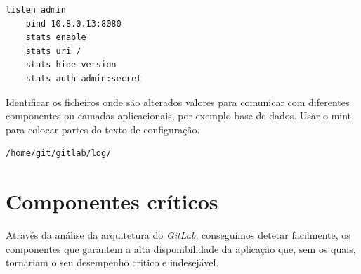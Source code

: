 \documentclass[12pt,a4paper]{article}
\begin{document}
\begin{verbatim}
listen admin  
    bind 10.8.0.13:8080
    stats enable
    stats uri /
    stats hide-version
    stats auth admin:secret
\end{verbatim}















Identificar os ficheiros onde são alterados valores para comunicar com diferentes componentes ou camadas aplicacionais, por exemplo base de dados.
Usar o mint para colocar partes do texto de configuração.

\begin{verbatim}
/home/git/gitlab/log/
\end{verbatim}








\newpage
\section{Componentes críticos}

Através da análise da arquitetura do \emph{GitLab}, conseguimos detetar facilmente, os componentes que garantem a alta disponibilidade da aplicação que, sem os quais, tornariam o seu desempenho critico e indesejável.
\end{document}
